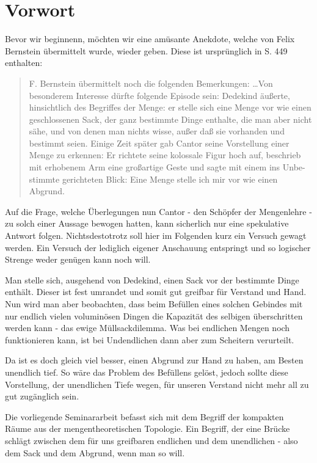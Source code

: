 \chapter{Vorwort}
Bevor wir beginnenn, möchten wir eine amüsante Anekdote, welche von Felix Bernstein übermittelt 
wurde, wieder geben. Diese ist ursprünglich in \cite{book:dedekind} S. 449 enthalten:

\begin{quote}
\glqq F. Bernstein übermittelt noch die folgenden Bemerkungen:
\glq \dots Von besonderem Interesse dürfte folgende Episode sein: Dedekind äußerte, hinsichtlich 
des Begriffes der Menge: er stelle sich eine Menge vor wie einen geschlossenen
Sack, der ganz bestimmte Dinge enthalte, die man aber nicht sähe, und von denen man
nichts wisse, außer daß sie vorhanden und bestimmt seien. Einige Zeit später gab Cantor
seine Vorstellung einer Menge zu erkennen: Er richtete seine kolossale Figur hoch auf,
beschrieb mit erhobenem Arm eine großartige Geste und sagte mit einem ins Unbe-
stimmte gerichteten Blick: \glq Eine Menge stelle ich mir vor wie einen Abgrund.\grq \grq \grqq
\end{quote}

Auf die Frage, welche Überlegungen nun Cantor - den Schöpfer der Mengenlehre - 
zu solch einer Aussage bewogen hatten, kann sicherlich nur eine spekulative Antwort folgen.
Nichtsdestotrotz soll hier im Folgenden kurz ein Versuch gewagt werden. Ein Versuch der lediglich
eigener Anschauung entspringt und so logischer Strenge weder genügen kann noch will.

Man stelle sich, ausgehend von Dedekind, einen Sack vor der bestimmte Dinge enthält.
Dieser ist fest umrandet und somit gut greifbar für Verstand und Hand. Nun wird man
aber beobachten, dass beim Befüllen eines solchen Gebindes mit nur endlich vielen voluminösen Dingen 
die Kapazität des selbigen überschritten werden kann - das ewige \glqq Müllsackdilemma\grqq .
Was bei endlichen Mengen noch funktionieren kann, ist bei Undendlichen dann aber zum Scheitern verurteilt.

Da ist es doch gleich viel besser, einen Abgrund zur Hand zu haben, am Besten unendlich tief. So wäre
das Problem des Befüllens gelöst, jedoch sollte diese Vorstellung, der unendlichen Tiefe wegen, für unseren
Verstand nicht mehr all zu gut zugänglich sein.

Die vorliegende Seminararbeit befasst sich mit dem Begriff der kompakten Räume aus der mengentheoretischen
Topologie. Ein Begriff, der eine Brücke schlägt zwischen dem für uns greifbaren endlichen und dem
unendlichen - also dem Sack und dem Abgrund, wenn man so will.

